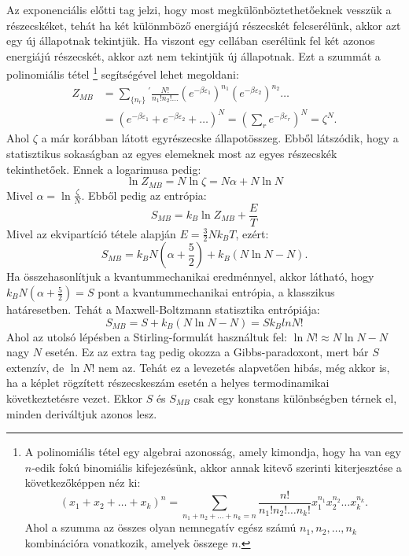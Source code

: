 \documentclass[../main.tex]{subfiles}
\begin{document}
Az exponenciális előtti tag jelzi, hogy most megkülönböztethetőeknek vesszük a részecskéket, tehát ha két különmböző energiájú részecskét felcserélünk, akkor azt egy új állapotnak tekintjük.
Ha viszont egy cellában cserélünk fel két azonos energiájú részecskét, akkor azt nem tekintjük új állapotnak. Ezt a szummát a polinomiális tétel
\footnote{
    A polinomiális tétel egy algebrai azonosság, amely kimondja, hogy ha van egy $n$-edik fokú binomiális kifejezésünk, akkor annak kitevő szerinti kiterjesztése a következőképpen néz ki:
    \begin{equation*}
        (x_1 + x_2 + \ldots + x_k)^n = \sum_{n_1 + n_2 + \ldots + n_k = n} \frac{n!}{n_1! n_2! \ldots n_k!} x_1^{n_1} x_2^{n_2} \ldots x_k^{n_k}.
    \end{equation*}
    Ahol a szumma az összes olyan nemnegatív egész számú $n_1, n_2, \ldots, n_k$ kombinációra vonatkozik, amelyek összege $n$.
}
segítségével lehet megoldani:
\begin{equation}
    \begin{aligned}
        Z_{MB} &= \sum_{\{n_r\}}^{}{}^{'} \frac{N!}{n_1! n_2! \ldots} (e^{-\beta \varepsilon_1})^{n_1} (e^{-\beta \varepsilon_2})^{n_2} \ldots \\
        &= (e^{-\beta \varepsilon_1} + e^{-\beta \varepsilon_2} + \ldots)^N = \left( \sum_r e^{-\beta \varepsilon_r} \right)^N = \zeta^N.
    \end{aligned}
\end{equation}
Ahol $\zeta$ a már korábban látott egyrészecske állapotösszeg. Ebből látszódik, hogy a statisztikus sokaságban az egyes elemeknek most az egyes részecskék tekinthetőek.
Ennek a logarimusa pedig:
\begin{equation}
    \ln Z_{MB} = N \ln \zeta = N\alpha + N \ln N
\end{equation}
Mivel $\alpha = \ln \frac{\zeta}{N}$. Ebből pedig az entrópia:
\begin{equation}
    S_{MB} = k_B \ln Z_{MB} + \frac{E}{T}
\end{equation}
Mivel az ekvipartíció tétele alapján $E = \frac{3}{2} N k_B T$, ezért:
\begin{equation}
    S_{MB} = k_B N \left(\alpha + \frac{5}{2}\right) + k_B (N \ln N - N).
\end{equation}
Ha összehasonlítjuk a kvantummechanikai eredménnyel, akkor látható, hogy $k_B N \left(\alpha + \frac{5}{2}\right) = S$ pont a kvantummechanikai entrópia, a klasszikus határesetben.
Tehát a Maxwell-Boltzmann statisztika entrópiája:
\begin{equation}
    S_{MB} = S + k_B (N \ln N - N) = S k_B ln N!
\end{equation}
Ahol az utolsó lépésben a Stirling-formulát használtuk fel: $\ln N! \approx N \ln N - N$ nagy $N$ esetén. Ez az extra tag pedig okozza a Gibbs-paradoxont, mert bár $S$ extenzív,
de $\ln N!$ nem az. Tehát ez a levezetés alapvetően hibás, még akkor is, ha a képlet rögzített részecskeszám esetén a helyes termodinamikai következtetésre vezet. Ekkor $S$ és $S_{MB}$ csak egy
konstans különbségben térnek el, minden deriváltjuk azonos lesz.
\end{document}

